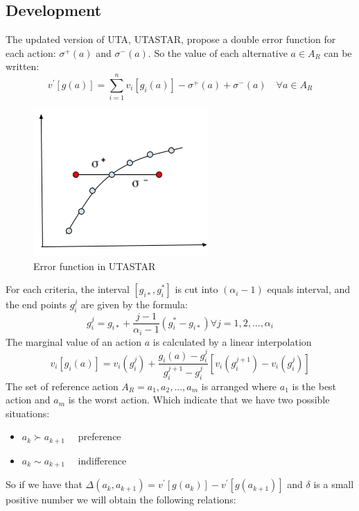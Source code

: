 \documentclass{report}
\begin{document}
\subsection{Development} 
The updated version of UTA, UTASTAR, propose a double error function for each action: $\sigma ^{+} (a)$ and $\sigma ^{-} (a)$.  So the value of each alternative $a \in A_R$ can be written: \\
\begin{equation}
	v^{'} [g(a)] = \sum_{i=1}^{n} v_i [g_i (a)] - \sigma ^{+} (a)+ \sigma ^{-} (a) \quad  \forall a \in A_R
\end{equation}
\begin{figure}[H]
    	\centering
	\includegraphics{error-function-utastar}
	\caption{Error function in UTASTAR}
\end{figure}
For each criteria, the interval $[g_{i*}, g_i^{*}]$ is cut into $(\alpha _i -1)$ equals interval, and the end points $g_i^{j}$ are given by the formula:
\begin{equation}
	g_i^{j}= g_{i*} + \frac{j-1}{\alpha _i -1} (g_i^{*} - g_{i*})  \forall j = 1,2, ..., \alpha _i
\end{equation}
The marginal value of an action $a$ is calculated by a linear interpolation
\begin{equation}
	v_i [g_i (a)] = v_i (g_i^{j}) + \frac{g_i (a) - g_i^{j}}{ g_i^{j+1} - g_i^{j}} [v_i (g_i^{j+1}) - v_i (g_i^{j}) ] 
\end{equation}
The set of reference action $ A_R = a_1, a_2, ... , a_m$ is arranged where $a_1$ is the best action and $a_m$ is the worst action. Which indicate that we have two possible situations:
\begin{itemize}
\item $a_k  \succ a_{k+1} \quad $ preference 
\item $a_k \sim a_{k+1} \quad $ indifference
\end{itemize} 
So if we have that $\Delta (a_k, a_{k+1} ) = v^{'} [g(a_k)] - v^{'} [g(a_{k+1})]$ and $\delta$ is a small positive number we will obtain the following relations: 
\end{document}
